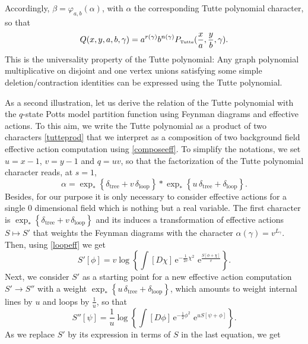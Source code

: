 \documentclass[12pt,here,feynmf]{article}
\begin{document}
Accordingly, $\beta=\varphi_{a,b}(\alpha)$, with $\alpha$ the corresponding Tutte polynomial character, so that
\begin{equation}
Q(x,y,a,b,\gamma)=a^{r(\gamma)}b^{n(\gamma)}P_{\mbox{\tiny Tutte}}(\frac{x}{a},\frac{y}{b},\gamma).
\end{equation}
This is the universality property of the Tutte polynomial: Any graph polynomial multiplicative on disjoint and one vertex unions satisfying some simple deletion/contraction identities can be expressed using the Tutte polynomial.  


As a second illustration, let us derive the relation of the Tutte polynomial with the $q$-state Potts model partition function using Feynman diagrams and effective actions. To this aim, we write the Tutte polynomial as a product of two characters \eqref{tutteprod} that we interpret as a composition of two background field effective action computation using \eqref{composeeff}. To simplify the notations, we set $u=x-1$, $v=y-1$ and $q=uv$, so that the factorization of the Tutte polynomial character reads, at $s=1$,
\begin{equation}
\alpha=\exp_{\ast}\left\{\delta_{\mathrm{tree}}+v\,\delta_{\mathrm{loop}}\right\}\ast
\exp_{\ast}\left\{u\,\delta_{\mathrm{tree}}+\delta_{\mathrm{loop}}\right\}.
\end{equation}
 Besides, for our purpose it is only necessary to consider  effective actions for a single 0 dimensional field which is nothing but a real variable. The first character is  $\exp_{\ast}\left\{\delta_{\mathrm{tree}}+v\,\delta_{\mathrm{loop}}\right\}$ and its induces a transformation of effective actions $S\mapsto S'$ that weights the Feynman diagrams with the character $\alpha(\gamma)=v^{L_{\gamma}}$. Then, using \eqref{loopeff} we get
\begin{equation}
S'[\phi]=v\log\left\{
\int[D\chi]\,\mathrm{e}^{-\frac{1}{2v}\chi^{2}}\,
\,\mathrm{e}^{\frac{S[\phi+\chi]}{v}}
\right\}.
\end{equation} 
Next, we consider $S'$ as a starting point for a new effective action computation $S'\rightarrow S''$ with a weight $\exp_{\ast}\left\{u\,\delta_{\mathrm{tree}}+\delta_{\mathrm{loop}}\right\}$, which amounts to weight internal lines by $u$ and loops by $\frac{1}{u}$, so that
\begin{equation}
S''[\psi]=\frac{1}{u}\log\left\{
\int[D\phi]\,\mathrm{e}^{-\frac{1}{2}\phi^{2}}\,
\,\mathrm{e}^{uS[\psi+\phi]}
\right\}.
\end{equation} 
As we replace $S'$ by its expression in terms of $S$ in the last equation, we get
\end{document}
